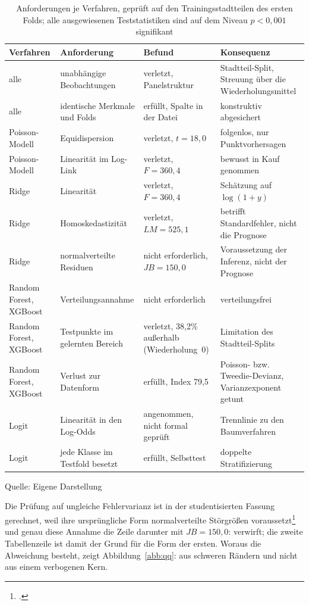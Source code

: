 \documentclass[12pt,a4paper]{article}
\renewcommand{\footnotesize}{\fontsize{10pt}{12pt}\selectfont}
\newcommand{\tabformat}{%
  \centering
  \singlespacing
  \footnotesize
  \setlength{\tabcolsep}{5pt}%
  \renewcommand{\arraystretch}{1.15}%
}
\newcommand{\tabquelle}[1][Eigene Darstellung]{%
  \par\setlength{\parskip}{0pt}\vspace{3pt}%
  {\setstretch{1}\fontsize{9pt}{11pt}\selectfont\raggedright Quelle: #1\par}%
}
\begin{document}
\begin{table}[htbp]
\tabformat
\caption{Anforderungen je Verfahren, geprüft auf den Trainingsstadtteilen des ersten Folds; alle ausgewiesenen Teststatistiken sind auf dem Niveau $p < 0{,}001$ signifikant}
\label{tab:anforderungen}
\begin{tabularx}{\textwidth}{@{}L{2.1cm} L{3.3cm} L{3.4cm} Y@{}}
\toprule
\textbf{Verfahren} & \textbf{Anforderung} & \textbf{Befund} & \textbf{Konsequenz} \\
\midrule
alle & unabhängige Beobachtungen & verletzt, Panelstruktur & Stadtteil-Split, Streuung über die Wiederholungsmittel \\
alle & identische Merkmale und Folds & erfüllt, Spalte in der Datei & konstruktiv abgesichert \\
\addlinespace
Poisson-Modell & Equidispersion & verletzt, $t = 18{,}0$ & folgenlos, nur Punktvorhersagen \\
Poisson-Modell & Linearität im Log-Link & verletzt, $F = 360{,}4$ & bewusst in Kauf genommen \\
\addlinespace
Ridge & Linearität & verletzt, $F = 360{,}4$ & Schätzung auf $\log(1+y)$ \\
Ridge & Homoskedastizität & verletzt, $LM = 525{,}1$ & betrifft Standardfehler, nicht die Prognose \\
Ridge & normalverteilte Residuen & nicht erforderlich, $JB = 150{,}0$ & Voraussetzung der Inferenz, nicht der Prognose \\
\addlinespace
Random Forest, XGBoost & Verteilungsannahme & nicht erforderlich & verteilungsfrei \\
Random Forest, XGBoost & Testpunkte im gelernten Bereich & verletzt, 38,2\% außerhalb (Wiederholung~0) & Limitation des Stadtteil-Splits \\
Random Forest, XGBoost & Verlust zur Datenform & erfüllt, Index 79,5 & Poisson- bzw. Tweedie-Devianz, Varianzexponent getunt \\
\addlinespace
Logit & Linearität in den Log-Odds & angenommen, nicht formal geprüft & Trennlinie zu den Baumverfahren \\
Logit & jede Klasse im Testfold besetzt & erfüllt, Selbsttest & doppelte Stratifizierung \\
\bottomrule
\end{tabularx}
\tabquelle
\end{table}

Die Prüfung auf ungleiche Fehlervarianz ist in der studentisierten Fassung gerechnet, weil ihre ursprüngliche Form normalverteilte Störgrößen voraussetzt\footcite[1288]{BreuschPagan1979} und genau diese Annahme die Zeile darunter mit $JB = 150{,}0$: verwirft; die zweite Tabellenzeile ist damit der Grund für die Form der ersten. Woraus die Abweichung besteht, zeigt Abbildung~\ref{abb:qq}: aus schweren Rändern und nicht aus einem verbogenen Kern.
\end{document}
